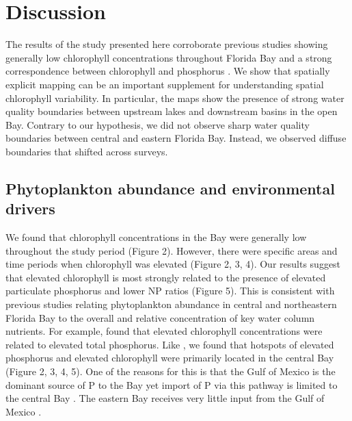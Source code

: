 \section{Discussion}
\label{discussion}

The results of the study presented here corroborate previous studies showing generally low chlorophyll concentrations throughout Florida Bay and a strong correspondence between chlorophyll and phosphorus \citep{fourqurean1993process, phlips_spatial_1996}. We show that spatially explicit mapping can be an important supplement for understanding spatial chlorophyll variability. In particular, the maps show the presence of strong water quality boundaries between upstream lakes and downstream basins in the open Bay. Contrary to our hypothesis, we did not observe sharp water quality boundaries between central and eastern Florida Bay. Instead, we observed diffuse boundaries that shifted across surveys.

\subsection{Phytoplankton abundance and environmental drivers}
\label{phytoabund}

We found that chlorophyll concentrations in the Bay were generally low throughout the study period (Figure 2). However, there were specific areas and time periods when chlorophyll was elevated (Figure 2, 3, 4). Our results suggest that elevated chlorophyll is most strongly related to the presence of elevated particulate phosphorus and lower NP ratios (Figure 5). This is consistent with previous studies relating phytoplankton abundance in central and northeastern Florida Bay to the overall and relative concentration of key water column nutrients. For example, \citet{fourqurean1993process} found that elevated chlorophyll concentrations were related to elevated total phosphorus. Like \citet{fourqurean1993process}, we found that hotspots of elevated phosphorus and elevated chlorophyll were primarily located in the central Bay (Figure 2, 3, 4, 5). One of the reasons for this is that the Gulf of Mexico is the dominant source of P to the Bay yet import of P via this pathway is limited to the central Bay \citep{childers_relating_2006, rudnick1999phosphorus}. The eastern Bay receives very little input from the Gulf of Mexico \citep{lee2016circulation}. 

